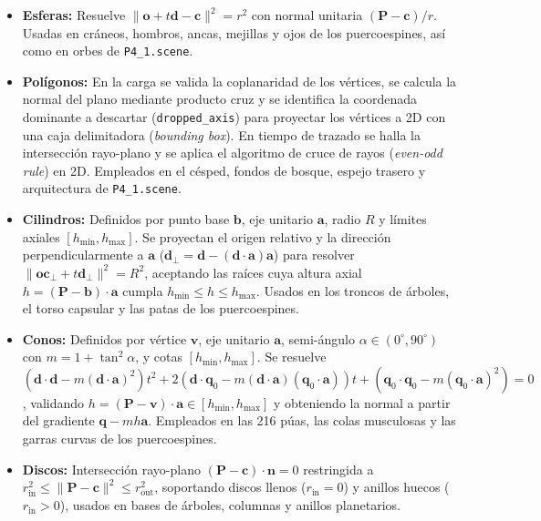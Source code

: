 \documentclass[11pt,letterpaper]{article}
\begin{document}
\begin{itemize}[leftmargin=1.5em]
    \item \textbf{Esferas:} Resuelve $\|\mathbf{o} + t\mathbf{d} - \mathbf{c}\|^2 = r^2$ con normal unitaria $(\mathbf{P} - \mathbf{c})/r$. Usadas en cráneos, hombros, ancas, mejillas y ojos de los puercoespines, así como en orbes de \texttt{P4\_1.scene}.
    \item \textbf{Polígonos:} En la carga se valida la coplanaridad de los vértices, se calcula la normal del plano mediante producto cruz y se identifica la coordenada dominante a descartar (\texttt{dropped\_axis}) para proyectar los vértices a 2D con una caja delimitadora (\textit{bounding box}). En tiempo de trazado se halla la intersección rayo-plano y se aplica el algoritmo de cruce de rayos (\textit{even-odd rule}) en 2D. Empleados en el césped, fondos de bosque, espejo trasero y arquitectura de \texttt{P4\_1.scene}.
    \item \textbf{Cilindros:} Definidos por punto base $\mathbf{b}$, eje unitario $\mathbf{a}$, radio $R$ y límites axiales $[h_{\min}, h_{\max}]$. Se proyectan el origen relativo y la dirección perpendicularmente a $\mathbf{a}$ ($\mathbf{d}_\perp = \mathbf{d} - (\mathbf{d}\cdot\mathbf{a})\mathbf{a}$) para resolver $\|\mathbf{oc}_\perp + t\mathbf{d}_\perp\|^2 = R^2$, aceptando las raíces cuya altura axial $h = (\mathbf{P}-\mathbf{b})\cdot\mathbf{a}$ cumpla $h_{\min} \le h \le h_{\max}$. Usados en los troncos de árboles, el torso capsular y las patas de los puercoespines.
    \item \textbf{Conos:} Definidos por vértice $\mathbf{v}$, eje unitario $\mathbf{a}$, semi-ángulo $\alpha \in (0^\circ, 90^\circ)$ con $m = 1 + \tan^2\alpha$, y cotas $[h_{\min}, h_{\max}]$. Se resuelve $(\mathbf{d}\cdot\mathbf{d} - m(\mathbf{d}\cdot\mathbf{a})^2)t^2 + 2(\mathbf{d}\cdot\mathbf{q}_0 - m(\mathbf{d}\cdot\mathbf{a})(\mathbf{q}_0\cdot\mathbf{a}))t + (\mathbf{q}_0\cdot\mathbf{q}_0 - m(\mathbf{q}_0\cdot\mathbf{a})^2) = 0$, validando $h = (\mathbf{P}-\mathbf{v})\cdot\mathbf{a} \in [h_{\min}, h_{\max}]$ y obteniendo la normal a partir del gradiente $\mathbf{q} - m h \mathbf{a}$. Empleados en las 216 púas, las colas musculosas y las garras curvas de los puercoespines.
    \item \textbf{Discos:} Intersección rayo-plano $(\mathbf{P} - \mathbf{c})\cdot\mathbf{n} = 0$ restringida a $r_{\text{in}}^2 \le \|\mathbf{P} - \mathbf{c}\|^2 \le r_{\text{out}}^2$, soportando discos llenos ($r_{\text{in}} = 0$) y anillos huecos ($r_{\text{in}} > 0$), usados en bases de árboles, columnas y anillos planetarios.

\end{itemize}
\end{document}
